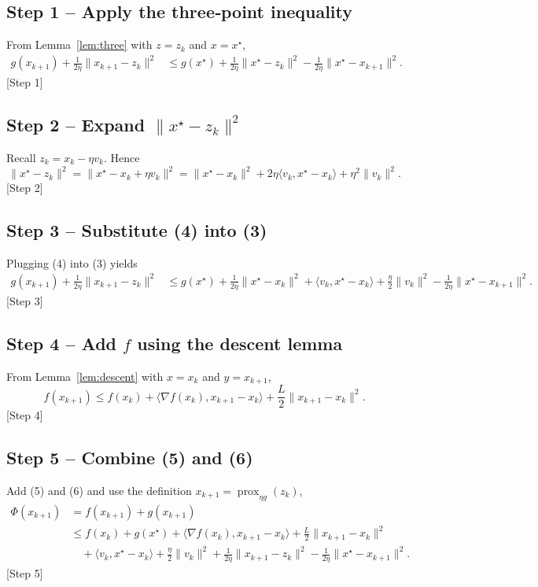 \documentclass{article}
\newcommand{\prox}{\operatorname{prox}}
\begin{document}
\subsection*{Step 1 – Apply the three‑point inequality}
From Lemma~\ref{lem:three} with $z=z_{k}$ and $x=x^{\star}$,
\[
\begin{aligned}
g(x_{k+1})+\frac{1}{2\eta}\|x_{k+1}-z_{k}\|^{2}
&\le g(x^{\star})+\frac{1}{2\eta}\|x^{\star}-z_{k}\|^{2}
-\frac{1}{2\eta}\|x^{\star}-x_{k+1}\|^{2}. \tag{3}
\end{aligned}
\]
[Step 1]

\subsection*{Step 2 – Expand $\|x^{\star}-z_{k}\|^{2}$}
Recall $z_{k}=x_{k}-\eta v_{k}$. Hence
\[
\|x^{\star}-z_{k}\|^{2}
=\|x^{\star}-x_{k}+\eta v_{k}\|^{2}
=\|x^{\star}-x_{k}\|^{2}+2\eta\langle v_{k},x^{\star}-x_{k}\rangle+\eta^{2}\|v_{k}\|^{2}.
\tag{4}
\]
[Step 2]

\subsection*{Step 3 – Substitute (4) into (3)}
Plugging (4) into (3) yields
\[
\begin{aligned}
g(x_{k+1})+\frac{1}{2\eta}\|x_{k+1}-z_{k}\|^{2}
&\le g(x^{\star})+\frac{1}{2\eta}\|x^{\star}-x_{k}\|^{2}
+\langle v_{k},x^{\star}-x_{k}\rangle
+\frac{\eta}{2}\|v_{k}\|^{2}
-\frac{1}{2\eta}\|x^{\star}-x_{k+1}\|^{2}. \tag{5}
\end{aligned}
\]
[Step 3]

\subsection*{Step 4 – Add $f$ using the descent lemma}
From Lemma~\ref{lem:descent} with $x=x_{k}$ and $y=x_{k+1}$,
\[
f(x_{k+1})\le f(x_{k})+\langle\nabla f(x_{k}),x_{k+1}-x_{k}\rangle
+\frac{L}{2}\|x_{k+1}-x_{k}\|^{2}. \tag{6}
\]
[Step 4]

\subsection*{Step 5 – Combine (5) and (6)}
Add (5) and (6) and use the definition $x_{k+1}= \prox_{\eta g}(z_{k})$,
\[
\begin{aligned}
\Phi(x_{k+1})
&=f(x_{k+1})+g(x_{k+1})\\
&\le f(x_{k})+g(x^{\star})
+\langle\nabla f(x_{k}),x_{k+1}-x_{k}\rangle
+\frac{L}{2}\|x_{k+1}-x_{k}\|^{2}\\
&\quad+\langle v_{k},x^{\star}-x_{k}\rangle
+\frac{\eta}{2}\|v_{k}\|^{2}
+\frac{1}{2\eta}\|x_{k+1}-z_{k}\|^{2}
-\frac{1}{2\eta}\|x^{\star}-x_{k+1}\|^{2}. \tag{7}
\end{aligned}
\]
[Step 5]
\end{document}
